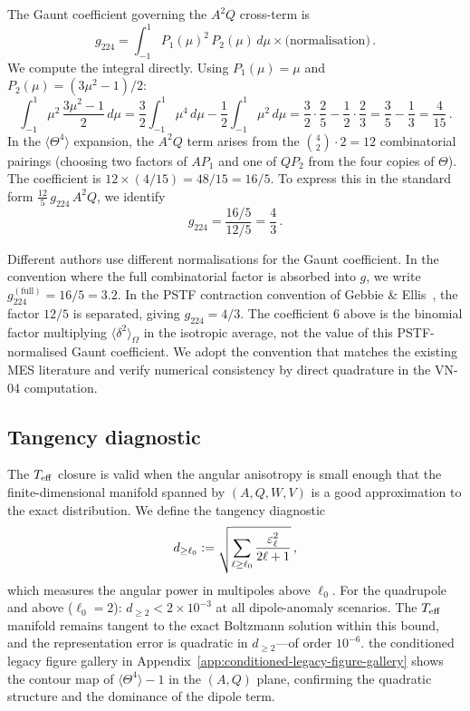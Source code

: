 The Gaunt coefficient governing the $A^2 Q$ cross-term is
\begin{equation}\label{eq:gaunt-def}
g_{224} = \int_{-1}^{1} P_1(\mu)^2\,P_2(\mu)\,d\mu
\times \text{(normalisation)}\,.
\end{equation}
We compute the integral directly.  Using $P_1(\mu) = \mu$ and
$P_2(\mu) = (3\mu^2 - 1)/2$:
\begin{equation}
\int_{-1}^{1} \mu^2\,\frac{3\mu^2 - 1}{2}\,d\mu
= \frac{3}{2}\int_{-1}^{1}\mu^4\,d\mu
  - \frac{1}{2}\int_{-1}^{1}\mu^2\,d\mu
= \frac{3}{2}\cdot\frac{2}{5}
  - \frac{1}{2}\cdot\frac{2}{3}
= \frac{3}{5} - \frac{1}{3}
= \frac{4}{15}\,.
\end{equation}
In the $\langle\Theta^4\rangle$ expansion, the $A^2 Q$
term arises from the $\binom{4}{2}\cdot 2 = 12$ combinatorial
pairings (choosing two factors of $A P_1$ and one of $Q P_2$
from the four copies of $\Theta$).  The coefficient is
$12 \times (4/15) = 48/15 = 16/5$.  To express this in the
standard form $\frac{12}{5}\,g_{224}\,A^2 Q$, we identify
\begin{equation}\label{eq:g224-value}
g_{224} = \frac{16/5}{12/5} = \frac{4}{3}\,.
\end{equation}

Different authors use different normalisations for the Gaunt
coefficient.  In the convention
where the full combinatorial factor is absorbed into $g$, we
write $g_{224}^{(\mathrm{full})} = 16/5 = 3.2$.  In the PSTF
contraction convention of Gebbie \&
Ellis~\cite{MaartensGE1999}, the factor $12/5$ is separated,
giving $g_{224} = 4/3$.  The coefficient $6$ above is the
binomial factor multiplying $\langle\delta^2\rangle_\Omega$ in
the isotropic average, not the value of this PSTF-normalised
Gaunt coefficient.  We adopt the convention that matches the
existing MES literature and verify numerical consistency by
direct quadrature in the VN-04 computation.


\subsection{Tangency diagnostic}\label{sec:tangency}

The $T_{\mathrm{eff}}$ closure is valid when the angular anisotropy is
small enough that the finite-dimensional manifold spanned by
$(A, Q, W, V)$ is a good approximation to the exact
distribution.  We define the tangency diagnostic
\begin{equation}\label{eq:tangency}
d_{\geq \ell_0}
:= \sqrt{\sum_{\ell \geq \ell_0}
  \frac{\varepsilon_\ell^2}{2\ell+1}}\,,
\end{equation}
which measures the angular power in multipoles above
$\ell_0$.  For the quadrupole and above ($\ell_0 = 2$):
$d_{\geq 2} < 2 \times 10^{-3}$ at all dipole-anomaly
scenarios.  The $T_{\mathrm{eff}}$ manifold remains tangent to the exact
Boltzmann solution within this bound, and the representation
error is quadratic in $d_{\geq 2}$---of order $10^{-6}$.
the conditioned legacy figure gallery in Appendix~\ref{app:conditioned-legacy-figure-gallery} shows the contour map of
$\langle\Theta^4\rangle - 1$ in the $(A, Q)$ plane, confirming
the quadratic structure and the dominance of the dipole term.


